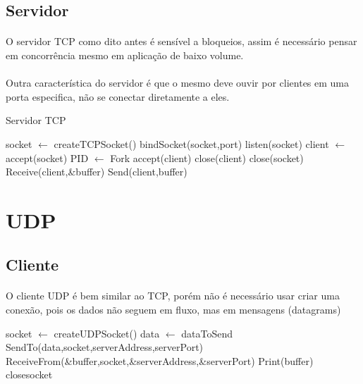 \documentclass{article}
\newcommand*\Let[2]{\State #1 $\gets$ #2}
\begin{document}
\subsection{Servidor}
\paragraph{} O servidor TCP como dito antes é sensível a bloqueios, assim é necessário
pensar em concorrência mesmo em aplicação de baixo volume.
\paragraph{} Outra característica do servidor é que o mesmo deve ouvir por clientes em uma porta
especifica, não se conectar diretamente a eles.
\begin{algorithm}
  \caption{Servidor TCP
    \label{alg:servidor-tcp}}
  \begin{algorithmic}[1]
    \Statex
    \Let{socket}{createTCPSocket()} 
    \State bindSocket(socket,port) 
    \State listen(socket) 
      \Let{client}{accept(socket)} 
      \Let{PID}{Fork}
      \State accept(client)
      \Else
      \State close(client)
      \EndIf
      \EndWhile
      \State close(socket)
      \EndFunction
      \State Receive(client,\&buffer)
      \State Send(client,buffer)
      \EndFunction
  \end{algorithmic}
\end{algorithm}
\section*{UDP}
\subsection{Cliente}
\paragraph{} O cliente UDP é bem similar ao TCP, porém não é necessário usar criar uma conexão,
pois os dados não seguem em fluxo, mas em mensagens (datagrams)
\begin{algorithm}
  \begin{algorithmic}[1]
    \Statex
    \Function{}{}
    \Let{socket}{createUDPSocket()} 
    \Let{data}{dataToSend}
    \State SendTo(data,socket,serverAddress,serverPort)
    \State ReceiveFrom(\&buffer,socket,\&serverAddress,\&serverPort)
    \State Print(buffer)
    \State close{socket}
      \EndFunction
  \end{algorithmic}
\end{algorithm}
\end{document}
